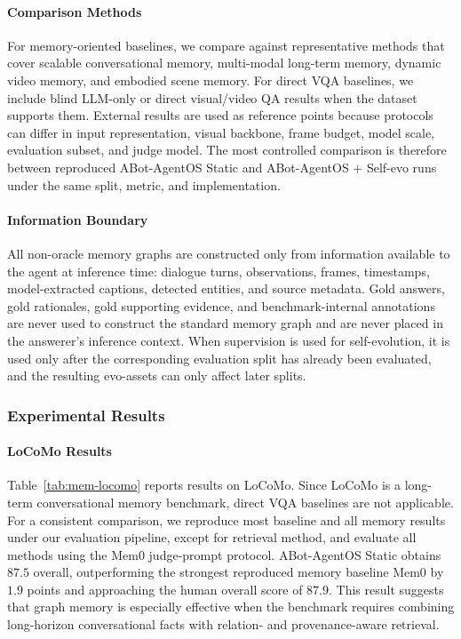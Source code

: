 \paragraph{Comparison Methods}
For memory-oriented baselines, we compare against representative methods that cover scalable conversational memory, multi-modal long-term memory, dynamic video memory, and embodied scene memory.
For direct VQA baselines, we include blind LLM-only or direct visual/video QA results when the dataset supports them.
External results are used as reference points because protocols can differ in input representation, visual backbone, frame budget, model scale, evaluation subset, and judge model.
The most controlled comparison is therefore between reproduced ABot-AgentOS Static and ABot-AgentOS + Self-evo runs under the same split, metric, and implementation.

\paragraph{Information Boundary}
All non-oracle memory graphs are constructed only from information available to the agent at inference time: dialogue turns, observations, frames, timestamps, model-extracted captions, detected entities, and source metadata.
Gold answers, gold rationales, gold supporting evidence, and benchmark-internal annotations are never used to construct the standard memory graph and are never placed in the answerer's inference context.
When supervision is used for self-evolution, it is used only after the corresponding evaluation split has already been evaluated, and the resulting evo-assets can only affect later splits.




\subsubsection{Experimental Results}
\label{subsubsec:memory-results}

\paragraph{LoCoMo Results}
Table~\ref{tab:mem-locomo} reports results on LoCoMo.
Since LoCoMo is a long-term conversational memory benchmark, direct VQA baselines are not applicable.
For a consistent comparison, we reproduce most baseline and all memory results under our evaluation pipeline, except for retrieval method, and evaluate all methods using the Mem0 judge-prompt protocol.
ABot-AgentOS Static obtains $87.5$ overall, outperforming the strongest reproduced memory baseline Mem0 by $1.9$ points and approaching the human overall score of $87.9$.
This result suggests that graph memory is especially effective when the benchmark requires combining long-horizon conversational facts with relation- and provenance-aware retrieval.


